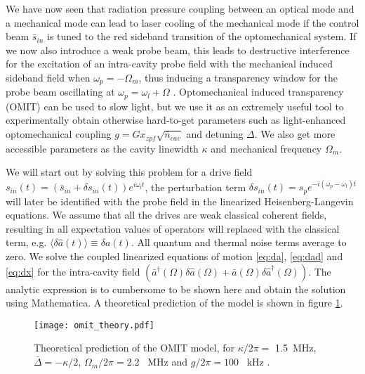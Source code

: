 We have now seen that radiation pressure coupling between an optical mode and a mechanical mode can lead to laser cooling of the mechanical mode if the control beam $\bar{s}_{in}$ is tuned to the red sideband transition of the optomechanical system. If we now also introduce a weak probe beam, this leads to destructive interference for the excitation of an intra-cavity probe field with the mechanical induced sideband field when $\omega_p = -\Omega_m$, thus inducing a transparency window for the probe beam oscillating at $\omega_p = \omega_l + \Omega$ \cite{weis2010}. Optomechanical induced transparency (OMIT) can be used to slow light, but we use it as an extremely useful tool to experimentally obtain otherwise hard-to-get parameters such as light-enhanced optomechanical coupling $g = Gx_{zpf}\sqrt{\bar{n}_{cav}}$ and detuning $\Delta$. We also get more accessible parameters as the cavity linewidth $\kappa$ and mechanical frequency $\Omega_m$.

We will start out by solving this problem for a drive field $s_{in}(t) = (\bar{s}_{in} + \delta s_{in}(t))e^{i\omega_l t}$, the perturbation term $\delta s_{in}(t) = s_pe^{-i(\omega_p - \omega_l)t}$ will later be identified with the probe field in the linearized Heisenberg-Langevin equations. We assume that all the drives are weak classical coherent fields, resulting in all expectation values of operators will replaced with the classical term, e.g. $\langle\delta\hat{a}(t)\rangle \equiv \delta a(t)$. All quantum and thermal noise terms average to zero. We solve the coupled linearized equations of motion \eqref{eq:da}, \eqref{eq:dad} and \eqref{eq:dx} for the intra-cavity field $(\bar{a}^\dagger(\Omega)\delta\hat{a}(\Omega) + \bar{a}(\Omega)\delta\hat{a}^\dagger(\Omega))$. The analytic expression is to cumbersome to be shown here and obtain the solution using Mathematica. A theoretical prediction of the model is shown in figure \ref{fig:omit_theory_lol}.

\begin{figure}[H]
\centering
\texttt{[image: omit\_theory.pdf]}
\caption{Theoretical prediction of the OMIT model, for $\kappa/2\pi = $ \SI{1.5}{\mega\hertz}, $\bar{\Delta} = -\kappa/2$, $\Omega_m/2\pi = 2.2$ \SI{}{\mega\hertz} and $g/2\pi = 100$ \SI{}{\kilo\hertz} .}
\label{fig:omit_theory_lol}
\end{figure}